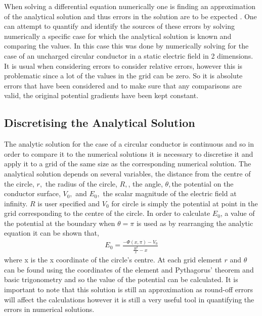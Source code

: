 \documentclass[aps,twocolumn,pre,nofootinbib,10pt]{revtex4-1}
\begin{document}
When solving a differential equation numerically one is finding an approximation of the analytical solution and thus errors in the solution are to be expected \cite{compmethods}.
One can attempt to quantify and identify the sources of these errors by solving numerically a specific case for which the analytical solution is known and comparing the values. In this case this was done by numerically solving for the case of an uncharged circular conductor in a static electric field in 2 dimensions. It is usual when considering errors to consider relative errors, however this is problematic since a lot of the values in the grid can be zero. So it is absolute errors that have been considered and to make sure that any comparisons are valid, the original potential gradients have been kept constant.

\subsection{Discretising the Analytical Solution}

The analytic solution for the case of a circular conductor is continuous and so in order to compare it to the numerical solutions it is necessary to discretise it and apply it to a grid of the same size as the corresponding numerical solution. The analytical solution depends on several variables, the distance from the centre of the circle, \(r,\) the radius of the circle, \(R,\), the angle, \(\theta,\)the potential on the conductor surface, \(V_0,\) and \(E_0,\) the scalar magnitude of the electric field at infinity. \(R\) is user specified and \(V_0\) for circle is simply the potential at point in the grid corresponding to the centre of the circle. In order to calculate \(E_0\), a value of the potential at the boundary when \(\theta = \pi\) is used as by rearranging the analytic equation it can be shown that,
\begin{gather*}
E_0 = \frac{-\Phi(x,\pi)-V_0}{\frac{R^2}{x} - x}
\end{gather*}
where x is the x coordinate of the circle's centre.
At each grid element \(r\) and \(\theta\) can be found using the coordinates of the element and Pythagorus' theorem and basic trigonometry and so the value of the potential can be calculated. It is important to note that this solution is still an approximation as round-off errors will affect the calculations however it is still a very useful tool in quantifying the errors in numerical solutions.
\end{document}
